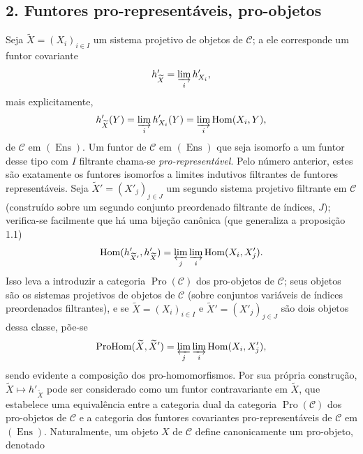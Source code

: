 \subsection*{2. Funtores pro-representáveis, pro-objetos}

Seja $\widetilde X=(X_i)_{i\in I}$ um sistema projetivo de objetos de
$\mathcal C$; a ele corresponde um funtor covariante
\[
  h'_{\widetilde X}=\varinjlim_i h'_{X_i},
\]
mais explicitamente,
\[
  h'_{\widetilde X}(Y)=\varinjlim_i h'_{X_i}(Y)
  =\varinjlim_i\operatorname{Hom}(X_i,Y),
\]
de $\mathcal C$ em $(\operatorname{Ens})$. Um funtor de $\mathcal C$ em
$(\operatorname{Ens})$ que seja isomorfo a um funtor desse tipo com $I$
filtrante chama-se \emph{pro-representável}. Pelo número anterior, estes são
exatamente os funtores isomorfos a limites indutivos filtrantes de funtores
representáveis. Seja $\widetilde X'=(X'_j)_{j\in J}$ um segundo sistema
projetivo filtrante em $\mathcal C$ (construído sobre um segundo conjunto
preordenado filtrante de índices, $J$); verifica-se facilmente que há uma
bijeção canônica (que generaliza a proposição 1.1)
\[
  \operatorname{Hom}(h'_{\widetilde X'},h'_{\widetilde X})
  =\varprojlim_j\varinjlim_i\operatorname{Hom}(X_i,X'_j).
\]
Isso leva a introduzir a categoria $\operatorname{Pro}(\mathcal C)$ dos
pro-objetos de $\mathcal C$; seus objetos são os sistemas projetivos de objetos
de $\mathcal C$ (sobre conjuntos variáveis de índices preordenados filtrantes),
e se $\widetilde X=(X_i)_{i\in I}$ e
$\widetilde X'=(X'_j)_{j\in J}$ são dois objetos dessa classe, põe-se
\[
  \operatorname{ProHom}(\widetilde X,\widetilde X')
  =\varprojlim_j\varinjlim_i\operatorname{Hom}(X_i,X'_j),
\]
sendo evidente a composição dos pro-homomorfismos. Por sua própria
construção, $\widetilde X\longmapsto h'_{\widetilde X}$ pode ser considerado
como um funtor contravariante em $\widetilde X$, que estabelece uma equivalência
entre a categoria dual da categoria $\operatorname{Pro}(\mathcal C)$ dos
pro-objetos de $\mathcal C$ e a categoria dos funtores covariantes
pro-representáveis de $\mathcal C$ em $(\operatorname{Ens})$. Naturalmente, um
objeto $X$ de $\mathcal C$ define canonicamente um pro-objeto, denotado

